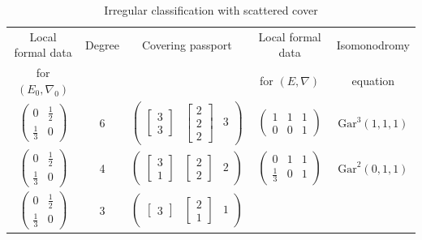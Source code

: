\documentclass[12]{amsart}
\begin{document}
\begin{table}[h]
\caption{Irregular classification with scattered cover}
\begin{center}
\begin{tabular}{|c|c|c|c|c|}
\hline 
Local formal data  & Degree & Covering passport & Local formal data & Isomonodromy \\
for $(E_0,\nabla_0)$ &&& for $(E,\nabla)$& equation\\
\hline
$\begin{pmatrix}0& \frac{1}{2}\\ \frac{1}{3} & 0\end{pmatrix}$ & 6 &
$\begin{pmatrix}  \left[\begin{matrix}3\\3\end{matrix}\right]  & \left[\begin{matrix}2\\2\\2\end{matrix}\right] &  3\end{pmatrix}$ &
$\begin{pmatrix}1& 1&1\\ 0&0 & 1\end{pmatrix}$& $\mathrm{Gar}^3(1,1,1)$ \\
\hline
$\begin{pmatrix}0& \frac{1}{2}\\ \frac{1}{3} & 0\end{pmatrix}$ & 4 &
$\begin{pmatrix}   \left[\begin{matrix}3\\1\end{matrix}\right] & \left[\begin{matrix}2\\2\end{matrix}\right]  & 2\end{pmatrix}$ &
$\begin{pmatrix}0& 1&1\\ \frac{1}{3} & 0&1\end{pmatrix}$ & $\mathrm{Gar}^2(0,1,1)$\\
\hline
$\begin{pmatrix}0& \frac{1}{2}\\ \frac{1}{3} & 0\end{pmatrix}$ & 3 &
$\begin{pmatrix}   \left[\begin{matrix}3\end{matrix}\right] & \left[\begin{matrix}2\\1\end{matrix}\right]  & 1\end{pmatrix}$ &

\end{tabular}
\end{center}
\end{table}
\end{document}
